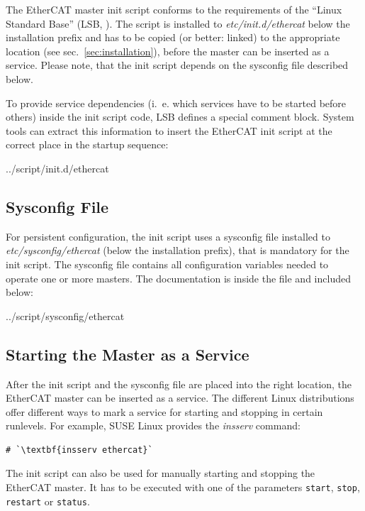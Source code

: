 \documentclass[a4paper,12pt,BCOR6mm,bibtotoc,idxtotoc]{scrbook}
\begin{document}
The EtherCAT master init script conforms to the requirements of the ``Linux
Standard Base'' (LSB, \cite{lsb}). The script is installed to
\textit{etc/init.d/ethercat} below the installation prefix and has to be
copied (or better: linked) to the appropriate location (see
sec.~\ref{sec:installation}), before the master can be inserted as a service.
Please note, that the init script depends on the sysconfig file described
below.

To provide service dependencies (i.~e. which services have to be started before
others) inside the init script code, LSB defines a special comment block.
System tools can extract this information to insert the EtherCAT init script at
the correct place in the startup sequence:


    {../script/init.d/ethercat}

\subsection{Sysconfig File}
\label{sec:sysconfig}

For persistent configuration, the init script uses a sysconfig file installed
to \textit{etc/sysconfig/ethercat} (below the installation prefix), that is
mandatory for the init script. The sysconfig file contains all configuration
variables needed to operate one or more masters. The documentation is inside
the file and included below:


    {../script/sysconfig/ethercat}

\subsection{Starting the Master as a Service}
\label{sec:service}

After the init script and the sysconfig file are placed into the right
location, the EtherCAT master can be inserted as a service. The different Linux
distributions offer different ways to mark a service for starting and stopping
in certain runlevels. For example, SUSE Linux provides the \textit{insserv}
command:

\begin{lstlisting}
# `\textbf{insserv ethercat}`
\end{lstlisting}

The init script can also be used for manually starting and stopping
the EtherCAT master. It has to be executed with one of the parameters
\texttt{start}, \texttt{stop}, \texttt{restart} or \texttt{status}.
\end{document}
